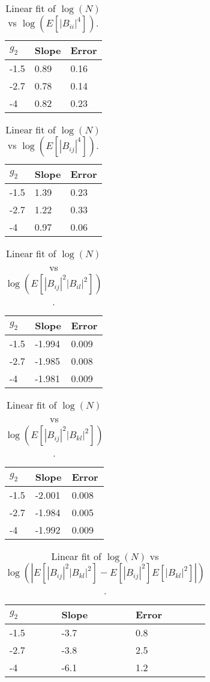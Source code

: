 \documentclass[12pt,a4paper]{article}
\begin{document}
\begin{table}[hp]
\centering
\begin{tabular}{|l|l|l|}
\hline
$g_2$ & Slope & Error \\ \hline
-1.5 & 0.89 & 0.16 \\ \hline
-2.7 & 0.78 & 0.14 \\ \hline
-4 & 0.82 & 0.23 \\ \hline
\end{tabular}
\caption{Linear fit of $\log(N)$ vs $\log(E[ |B_{ii}|^4 ])$.}
\label{tab:NB4iiexp}
\end{table}
\begin{table}[hp]
\centering
\begin{tabular}{|l|l|l|}
\hline
$g_2$ & Slope & Error \\ \hline
-1.5 & 1.39 & 0.23 \\ \hline
-2.7 & 1.22 & 0.33 \\ \hline
-4 & 0.97 & 0.06 \\ \hline
\end{tabular}
\caption{Linear fit of $\log(N)$ vs $\log(E[ |B_{ij}|^4 ])$.}
\label{tab:NB4ijexp}
\end{table}
\newpage
\begin{table}[hp]
\centering
\begin{tabular}{|l|l|l|}
\hline
$g_2$ & Slope & Error \\ \hline
-1.5 & -1.994 & 0.009 \\ \hline
-2.7 & -1.985 & 0.008 \\ \hline
-4 & -1.981 & 0.009 \\ \hline
\end{tabular}
\caption{Linear fit of $\log(N)$ vs $\log(E[ |B_{ij}|^2  |B_{il}|^2   ])$.}
\label{tab:NBijil}
\end{table}
\begin{table}[hp]
\centering
\begin{tabular}{|l|l|l|}
\hline
$g_2$ & Slope & Error \\ \hline
-1.5 & -2.001 & 0.008 \\ \hline
-2.7 & -1.984 & 0.005 \\ \hline
-4 & -1.992 & 0.009 \\ \hline
\end{tabular}
\caption{Linear fit of $\log(N)$ vs $\log(E[ |B_{ij}|^2  |B_{kl}|^2   ])$.}
\label{tab:NBijkl}
\end{table}
\begin{table}[hp]
\centering
\begin{tabular}{|l|l|l|}
\hline
$g_2$ & Slope & Error \\ \hline
-1.5 & -3.7 & 0.8 \\ \hline
-2.7 & -3.8 & 2.5 \\ \hline
-4 & -6.1 & 1.2 \\ \hline
\end{tabular}
\caption{Linear fit of $\log(N)$ vs $\log(|E[ |B_{ij}|^2  |B_{kl}|^2 ] - E[ |B_{ij}|^2 ] E[ |B_{kl}|^2 ]|)$.}
\label{tab:NBstatind}
\end{table}
\end{document}

